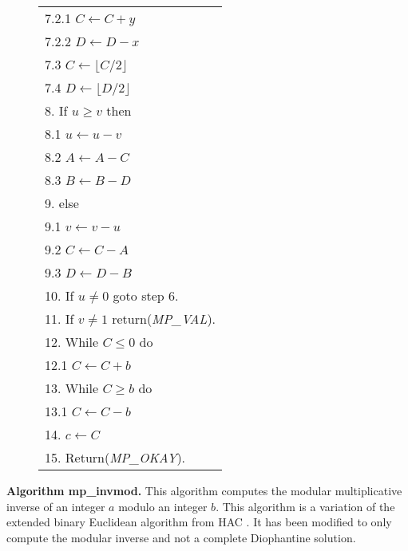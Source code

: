 \documentclass[b5paper]{book}
\begin{document}
\begin{figure}[!here]
\begin{small}
\begin{center}
\begin{tabular}{l}
\hspace{6mm}7.2.1  $C \leftarrow C + y$ \\
\hspace{6mm}7.2.2  $D \leftarrow D - x$ \\
\hspace{3mm}7.3  $C \leftarrow \lfloor C / 2 \rfloor$ \\
\hspace{3mm}7.4  $D \leftarrow \lfloor D / 2 \rfloor$ \\
8.  If $u \ge v$ then \\
\hspace{3mm}8.1  $u \leftarrow u - v$ \\
\hspace{3mm}8.2  $A \leftarrow A - C$ \\
\hspace{3mm}8.3  $B \leftarrow B - D$ \\
9.  else \\
\hspace{3mm}9.1  $v \leftarrow v - u$ \\
\hspace{3mm}9.2  $C \leftarrow C - A$ \\
\hspace{3mm}9.3  $D \leftarrow D - B$ \\
10.  If $u \ne 0$ goto step 6. \\
11.  If $v \ne 1$ return(\textit{MP\_VAL}). \\
12.  While $C \le 0$ do \\
\hspace{3mm}12.1  $C \leftarrow C + b$ \\
13.  While $C \ge b$ do \\
\hspace{3mm}13.1  $C \leftarrow C - b$ \\
14.  $c \leftarrow C$ \\
15.  Return(\textit{MP\_OKAY}). \\
\hline
\end{tabular}
\end{center}
\end{small}
\end{figure}
\textbf{Algorithm mp\_invmod.}
This algorithm computes the modular multiplicative inverse of an integer $a$ modulo an integer $b$.  This algorithm is a variation of the 
extended binary Euclidean algorithm from HAC \cite[pp. 608]{HAC}.  It has been modified to only compute the modular inverse and not a complete
Diophantine solution.  
\end{document}

